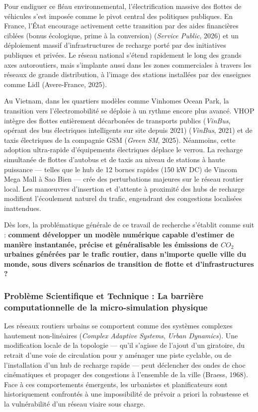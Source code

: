 \documentclass[10pt, a4paper]{article}
\begin{document}
Pour endiguer ce fléau environnemental, l'électrification massive des
flottes de véhicules s'est imposée comme le pivot central des politiques
publiques. En France, l'État encourage activement cette transition par
des aides financières ciblées (bonus écologique, prime à la conversion)
(\emph{Service Public}, 2026) et un déploiement massif d'infrastructures
de recharge porté par des initiatives publiques et privées. Le réseau
national s'étend rapidement le long des grands axes autoroutiers, mais
s'implante aussi dans les zones commerciales à travers les réseaux de
grande distribution, à l'image des stations installées par des enseignes
comme Lidl (Avere-France, 2025).

Au Vietnam, dans les quartiers modèles comme Vinhomes Ocean Park, la
transition vers l'électromobilité se déploie à un rythme encore plus
avancé. VHOP intègre des flottes entièrement décarbonées de transports
publics (\emph{VinBus}, opérant des bus électriques intelligents sur
site depuis 2021) (\emph{VinBus}, 2021) et de taxis électriques de la
compagnie GSM (\emph{Green SM}, 2025). Néanmoins, cette adoption
ultra-rapide d'équipements électriques déplace le verrou. La recharge
simultanée de flottes d'autobus et de taxis au niveau de stations à
haute puissance --- telles que le hub de 12 bornes rapides (150 kW DC)
de Vincom Mega Mall à Sao Bien --- crée des perturbations majeures sur
le réseau routier local. Les manœuvres d'insertion et d'attente à
proximité des hubs de recharge modifient l'écoulement naturel du trafic,
engendrant des congestions localisées inattendues.

Dès lors, la problématique générale de ce travail de recherche s'établit
comme suit : \textbf{comment développer un modèle numérique capable
d'estimer de manière instantanée, précise et généralisable les émissions
de \(CO_2\) urbaines générées par le trafic routier, dans n'importe
quelle ville du monde, sous divers scénarios de transition de flotte et
d'infrastructures ?}

\subsubsection{Problème Scientifique et Technique : La barrière
computationnelle de la micro-simulation
physique}\label{probluxe8me-scientifique-et-technique-la-barriuxe8re-computationnelle-de-la-micro-simulation-physique}

Les réseaux routiers urbains se comportent comme des systèmes complexes
hautement non-linéaires (\emph{Complex Adaptive Systems}, \emph{Urban
Dynamics}). Une modification locale de la topologie --- qu'il s'agisse
de l'ajout d'un giratoire, du retrait d'une voie de circulation pour y
aménager une piste cyclable, ou de l'installation d'un hub de recharge
rapide --- peut déclencher des ondes de choc cinématiques et propager
des congestions à l'ensemble de la ville (Braess, 1968). Face à ces
comportements émergents, les urbanistes et planificateurs sont
historiquement confrontés à une impossibilité de prévoir a priori la
robustesse et la vulnérabilité d'un réseau viaire sous charge.
\end{document}
